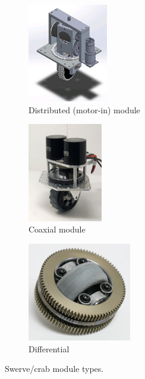 \begin{figure}[H]

\begin{subfigure}[b]{.32\linewidth}
	\includegraphics[height=1.7in]{imgs/drivetrain_swerve_dist.jpeg}
	\caption{Distributed (motor-in) module}
\end{subfigure}\begin{subfigure}[b]{.32\linewidth}
	\includegraphics[height=1.7in]{imgs/drivetrain_swerve_coax.jpeg}
	\caption{Coaxial module}
\end{subfigure}\begin{subfigure}[b]{.32\linewidth}
	\includegraphics[height=1.7in]{imgs/drivetrain_swerve_diff.png}
	\caption{Differential}
\end{subfigure}
\caption{Swerve/crab module types.}
\end{figure}

